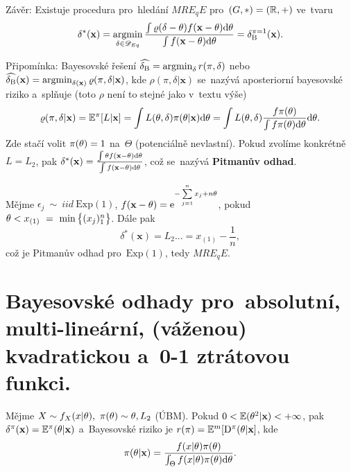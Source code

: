 Závěr: Existuje procedura pro~hledání $MRE_qE$ pro~$(G,\ast)=(\mathbb{R},+)$ ve~tvaru
$$ \delta^\ast(\textbf{x})=\mathop{\mathrm{argmin}}_{\delta\in\mathscr{D} _{Eq}}\frac{\int\varrho(\delta-\theta)f(\textbf{x}-\theta)\mathrm{d}\theta}{\int f(\textbf{x}-\theta)\mathrm{d}\theta}=\delta_\mathrm{B}^{\pi=1}(\textbf{x}).$$

\begin{remark}
	Připomínka: Bayesovské řešení $\widehat{\delta_\mathrm{B}}=\mathop{\mathrm{argmin}}_\delta r(\pi,\delta)$ nebo $\widehat{\delta_\mathrm{B}}(\textbf{x})= \mathop{\mathrm{argmin}}_{\delta(\textbf{x})}\varrho(\pi,\delta|\textbf{x})$, kde $\rho(\pi,\delta|\textbf{x})$ se~nazývá aposteriorní bayesovské riziko a~splňuje (toto $\rho$ není to stejné jako v~textu výše) 
	$$ \varrho(\pi,\delta|\textbf{x})=\mathbb{E}^\pi[L|\textbf{x}]=\int L(\theta,\delta)\pi(\theta|\textbf{x})\mathrm{d}\theta=\int L(\theta,\delta)\frac{f \pi(\theta)}{\int f \pi(\theta)\mathrm{d}\theta}\mathrm{d}\theta.$$
 Zde stačí volit $\pi(\theta)=1$ na~$\Theta$ (potenciálně nevlastní). Pokud zvolíme konkrétně $L=L_2$, pak $\delta^\ast(\textbf{x})=\frac{\int\theta f(\textbf{x}-\theta)\mathrm{d}\theta}{\int f(\textbf{x}-\theta)\mathrm{d}\theta}$, což se~nazývá \textbf{Pitmanův odhad}.
\end{remark}
\begin{example}
	Mějme $\epsilon_j~\sim~iid~\mathrm{Exp}(1)$, $f(\textbf{x}-\theta)=\mathrm{e}^{-\sum\limits_{j=1}^{n} x_j+n\theta}$, pokud $\theta< x_{(1)}~=~\min\big\{ (x_j)_1^n\big\}$. Dále pak
	$$ \delta^\ast(\textbf{x})\equal{L_2}...=x_{(1)}-\frac{1}{n},$$ což je Pitmanův odhad pro~$\mathrm{Exp}(1)$, tedy $MRE_qE$.
\end{example}

\chapter{Bayesovské odhady pro~absolutní, multi-lineární, (váženou) kvadratickou a~0-1 ztrátovou funkci.}
\begin{theorem}\label{veta1}
	Mějme $X\sim f_{X}(x|\theta),~\pi(\theta)\sim \theta,L_2$ (ÚBM). Pokud $0<\mathbb{E}(\theta^2|\textbf{x})<+\infty$, pak $\delta^\pi(\textbf{x})=\mathbb{E}^\pi(\theta|\textbf{x})$ a~Bayesovské riziko  je $r(\pi)=\mathbb{E}^m[\mathrm{D}^\pi(\theta|\textbf{x}]$, kde $$\pi(\theta|\textbf{x})=\frac{f(x|\theta)\pi(\theta)}{\int_\Theta f(x|\theta)\pi(\theta)\mathrm{d}\theta}.$$ 
\end{theorem}

